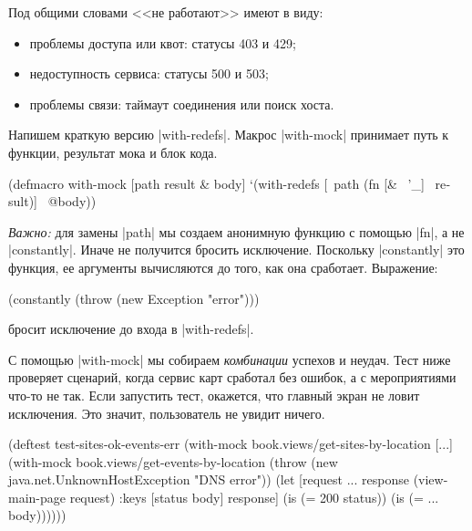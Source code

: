 Под общими словами <<не работают>> имеют в виду:

\begin{itemize}

\item
  проблемы доступа или квот: статусы 403 и 429;

\item
  недоступность сервиса: статусы 500 и 503;

\item
  проблемы связи: таймаут соединения или поиск хоста.

\end{itemize}

Напишем краткую версию \spverb|with-redefs|. Макрос \spverb|with-mock| принимает
путь к функции, результат мока и блок кода.

\begin{english}
  \begin{clojure}
(defmacro with-mock
  [path result & body]
  `(with-redefs
     [~path (fn [& ~'_] ~result)]
     ~@body))
  \end{clojure}
\end{english}

\emph{Важно:} для замены \spverb|path| мы создаем анонимную функцию с помощью
\spverb|fn|, а не \spverb|constantly|. Иначе не получится бросить
исключение. Поскольку \spverb|constantly| это функция, ее аргументы вычисляются
до того, как она сработает. Выражение:

\begin{english}
  \begin{clojure}
(constantly (throw (new Exception "error")))
  \end{clojure}
\end{english}

\noindent
бросит исключение до входа в \spverb|with-redefs|.

С помощью \spverb|with-mock| мы собираем \emph{комбинации} успехов и
неудач. Тест ниже проверяет сценарий, когда сервис карт сработал без ошибок, а с
мероприятиями что-то не так. Если запустить тест, окажется, что главный экран не
ловит исключения. Это значит, пользователь не увидит ничего.

\begin{english}
  \begin{clojure}
(deftest test-sites-ok-events-err
  (with-mock book.views/get-sites-by-location [...]
    (with-mock book.views/get-events-by-location
      (throw (new java.net.UnknownHostException "DNS error"))
      (let [request {...}
            response (view-main-page request)
            {:keys [status body]} response]
        (is (= 200 status))
        (is (= {...} body))))))
  \end{clojure}
\end{english}

